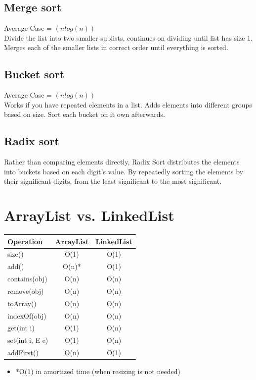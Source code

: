 \documentclass{article}
\begin{document}
\subsection{Merge sort}
Average Case = $(nlog(n))$\\
Divide the list into two smaller sublists, continues on dividing until list has size 1. Merges each of the smaller lists in correct order until everything is sorted. 
\subsection{Bucket sort}
Average Case = $(nlog(n))$\\
Works if you have repeated elements in a list. Adds elements into different groups based on size. Sort each bucket on it own afterwards. 

\subsection{Radix sort}
Rather than comparing elements directly, Radix Sort distributes the elements into buckets based on each digit’s value. 
By repeatedly sorting the elements by their significant digits, from the least significant to the most significant.

\newpage

\section{ArrayList vs. LinkedList}
\begin{table}[!ht]
\centering
\begin{tabular}{|l|c|c|}
\hline
\textbf{Operation} & \textbf{ArrayList} & \textbf{LinkedList} \\
\hline
size() & O(1) & O(1) \\
\hline
add() & O(n)* & O(1) \\
\hline
contains(obj) & O(n) & O(n) \\
\hline
remove(obj) & O(n) & O(n) \\
\hline
toArray() & O(n) & O(n) \\
\hline
indexOf(obj) & O(n) & O(n) \\
\hline
get(int i) & O(1) & O(n) \\
\hline
set(int i, E e) & O(1) & O(n) \\
\hline
addFirst() & O(n) & O(1) \\
\hline
\end{tabular}
\end{table}
\begin{itemize}
  \item *O(1) in amortized time (when resizing is not needed)
\end{itemize}
\end{document}
